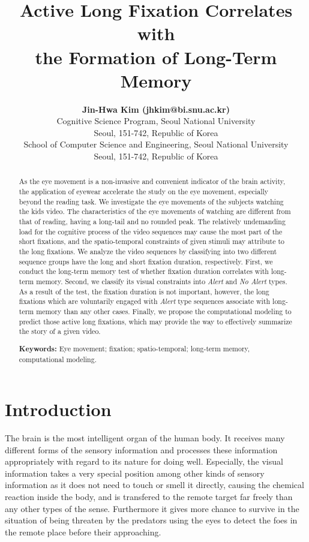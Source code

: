 \documentclass[10pt,letterpaper]{article}
\title{Active Long Fixation Correlates with \\ the Formation of Long-Term Memory}
\author{{\large \bf Jin-Hwa Kim (jhkim@bi.snu.ac.kr)} \\
  Cognitive Science Program, Seoul National University \\
  Seoul, 151-742, Republic of Korea
  \AND {\large \bf Byoung-Tak Zhang (btzhang@bi.snu.ac.kr)} \\
  School of Computer Science and Engineering, Seoul National University \\
  Seoul, 151-742, Republic of Korea}
\begin{document}
\maketitle

\begin{abstract}
As the eye movement is a non-invasive and convenient indicator of the brain activity, the application of eyewear accelerate the study on the eye movement, especially beyond the reading task. We investigate the eye movements of the subjects watching the kids video. The characteristics of the eye movements of watching are different from that of reading, having a long-tail and no rounded peak. The relatively undemanding load for the cognitive process of the video sequences may cause the most part of the short fixations, and the spatio-temporal constraints of given stimuli may attribute to the long fixations. We analyze the video sequences by classifying into two different sequence groups have the long and short fixation duration, respectively. First, we conduct the long-term memory test of whether fixation duration correlates with long-term memory. Second, we classify its visual constraints into \textit{Alert} and \textit{No Alert} types. As a result of the test, the fixation duration is not important, however, the long fixations which are voluntarily engaged with \textit{Alert} type sequences associate with long-term memory than any other cases. Finally, we propose the computational modeling to predict those active long fixations, which may provide the way to effectively summarize the story of a given video.

\textbf{Keywords:} 
Eye movement; fixation; spatio-temporal; long-term memory, computational modeling.
\end{abstract}


\section{Introduction}

The brain is the most intelligent organ of the human body. It receives many different forms of the sensory information and processes these information appropriately with regard to its nature for doing well. Especially, the visual information takes a very special position among other kinds of sensory information as it does not need to touch or smell it directly, causing the chemical reaction inside the body, and is transfered to the remote target far freely than any other types of the sense. Furthermore it gives more chance to survive in the situation of being threaten by the predators using the eyes to detect the foes in the remote place before their approaching. 
\end{document}

